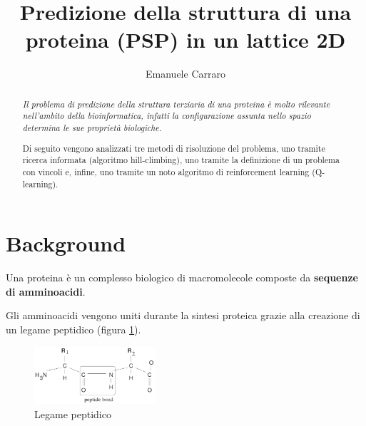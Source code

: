 \documentclass[twocolumn,10pt]{asme2ej}
\title{Predizione della struttura di una proteina (PSP) in un lattice 2D}
\author{Emanuele Carraro}
\begin{document}
\maketitle    

\begin{abstract}
{\it Il problema di predizione della struttura terziaria di una proteina è molto rilevante nell'ambito della bioinformatica, infatti la configurazione assunta nello spazio determina le sue proprietà biologiche.

Di seguito vengono analizzati tre metodi di risoluzione del problema, uno tramite ricerca informata (algoritmo hill-climbing), uno tramite la definizione di un problema con vincoli e, infine, uno tramite un noto algoritmo di reinforcement learning (Q-learning).
}
\end{abstract}

\begin{nomenclature}
\end{nomenclature}

\section{Background}

Una proteina è un complesso biologico di macromolecole composte da \textbf{sequenze di amminoacidi}.

Gli amminoacidi vengono uniti durante la sintesi proteica grazie alla creazione di un legame peptidico (figura \ref{fig:pept}).

\begin{figure}[h]
\centering
\includegraphics[width=0.4\textwidth]{figure/peptideBond.png}
\caption{Legame peptidico}
\label{fig:pept}
\end{figure}
\end{document}
